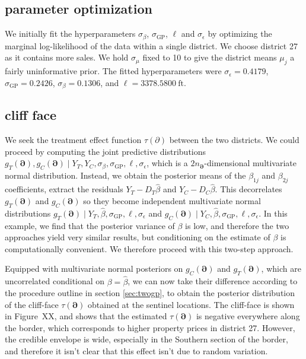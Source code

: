 \documentclass[letter]{article}
\newcommand{\sigmaf}{\sigma_{\mathrm{GP}}}
\newcommand{\sigman}{\sigma_{\epsilon}}
\newcommand{\boundary}{\partial}
\newcommand{\sentinels}{\bm{\boundary}}
\begin{document}
    	\subsection{parameter optimization}\label{parameter-optimization}

We initially fit the hyperparameters \(\sigma_\beta\), \(\sigmaf\),
\(\ell\) and \(\sigman\) by optimizing the marginal log-likelihood of
the data within a single district. We choose district 27 as it contains
more sales. We hold \(\sigma_\mu\) fixed to 10 to give the district
means \(\mu_j\) a fairly uninformative prior. The fitted hyperparameters
were \(\sigman=0.4179\), \(\sigmaf=0.2426\), \(\sigma_\beta=0.1306\),
and \(\ell=3378.5800~\text{ft}\).
    


    	\subsection{cliff face}\label{cliff-face}

We seek the treatment effect function \(\tau(\boundary)\) between the
two districts. We could proceed by computing the joint predictive
distributions
\(g_T(\sentinels),g_C(\sentinels) \mid Y_T, Y_C, \sigma_\beta,\sigmaf,\ell,\sigman\),
which is a \(2 n_{\sentinels}\)-dimensional multivariate normal
distribution. Instead, we obtain the posterior means of the
\(\beta_{1j}\) and \(\beta_{2j}\) coefficients, extract the residuals
\(Y_T-D_T \hat{\beta}\) and \(Y_C-D_C \hat{\beta}\). This decorrelates
\(g_T(\sentinels)\) and \(g_C(\sentinels)\) so they become independent
multivariate normal distributions
\(g_T(\sentinels) \mid Y_T, \hat\beta, \sigmaf,\ell,\sigman\) and
\(g_C(\sentinels) \mid Y_C, \hat\beta, \sigmaf,\ell,\sigman\). In this
example, we find that the posterior variance of \(\beta\) is low, and
therefore the two approaches yield very similar results, but
conditioning on the estimate of \(\beta\) is computationally convenient.
We therefore proceed with this two-step approach.

Equipped with multivariate normal posteriors on \(g_C(\sentinels)\) and
\(g_T(\sentinels)\), which are uncorrelated conditional on
\(\beta=\hat\beta\), we can now take their difference according to the
procedure outline in section \ref{sec:twogp}, to obtain the posterior
distribution of the cliff-face \(\tau(\sentinels)\) obtained at the
sentinel locations. The cliff-face is shown in Figure~XX, and shows that
the estimated \(\tau(\sentinels)\) is negative everywhere along the
border, which corresponds to higher property prices in district 27.
However, the credible envelope is wide, especially in the Southern
section of the border, and therefore it isn't clear that this effect
isn't due to random variation.
\end{document}
